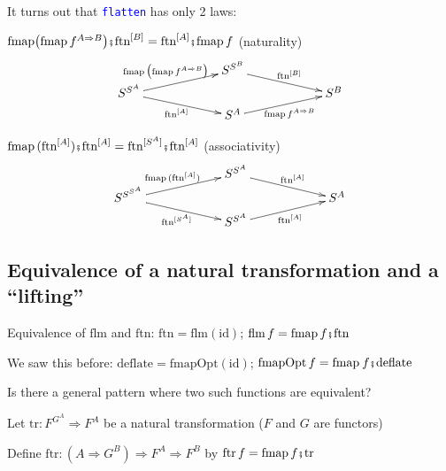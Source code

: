 It turns out that \texttt{\textcolor{blue}{\footnotesize{}flatten}}
has only 2 laws:

{\footnotesize{}$\text{fmap}\big(\text{fmap}\,f^{A\Rightarrow B}\big)\bef\text{ftn}^{\left[B\right]}=\text{ftn}^{\left[A\right]}\bef\text{fmap}\,f$}
{\footnotesize{}(naturality)
\[
\xymatrix{\xyScaleY{0.2pc}\xyScaleX{5pc} & S^{S^{B}}\ar[rd]\sp(0.5){\ \text{ftn}^{\left[B\right]}}\\
S^{S^{A}}\ar[ru]\sp(0.5){\text{fmap}\,\big(\text{fmap}\,f^{A\Rightarrow B}\big)\ \ }\ar[rd]\sb(0.5){\text{ftn}^{\left[A\right]}\,} &  & S^{B}\\
 & S^{A}\ar[ru]\sb(0.5){\text{fmap}\,f^{A\Rightarrow B}}
}
\]
}{\footnotesize\par}

{\footnotesize{}$\text{fmap}\,(\text{ftn}^{\left[A\right]})\bef\text{ftn}^{\left[A\right]}=\text{ftn}^{[S^{A}]}\bef\text{ftn}^{\left[A\right]}$}
{\footnotesize{}(associativity) 
\[
\xymatrix{\xyScaleY{0.2pc}\xyScaleX{5pc} & S^{S^{A}}\ar[rd]\sp(0.5){\ \text{ftn}^{\left[A\right]}}\\
S^{S^{S^{A}}}\ar[ru]\sp(0.5){\text{fmap}\,(\text{ftn}^{\left[A\right]})\ }\ar[rd]\sb(0.5){\text{ftn}^{[S^{A}]}\,} &  & S^{A}\\
 & S^{S^{A}}\ar[ru]\sb(0.5){\text{ftn}^{\left[A\right]}}
}
\]
}{\footnotesize\par}


\subsection{Equivalence of a natural transformation and a ``lifting''}

Equivalence of {\footnotesize{}$\text{flm}$} and {\footnotesize{}$\text{ftn}$}:
{\footnotesize{}$\text{ftn}=\text{flm}\left(\text{id}\right)$; $\text{flm}\,f=\text{fmap}\,f\bef\text{ftn}$} 

We saw this before: {\footnotesize{}$\text{deflate}=\text{fmapOpt}\left(\text{id}\right)$};
{\footnotesize{}$\text{fmapOpt}\,f=\text{fmap}\:f\bef\text{deflate}$} 

Is there a general pattern where two such functions are equivalent?

Let {\footnotesize{}$\text{tr}:F^{G^{A}}\Rightarrow F^{A}$ }be a
natural transformation ($F$ and $G$ are functors)

Define {\footnotesize{}$\text{ftr}:\left(A\Rightarrow G^{B}\right)\Rightarrow F^{A}\Rightarrow F^{B}$}
by {\footnotesize{}$\text{ftr}\,f=\text{fmap}\,f\bef\text{tr}$} 

